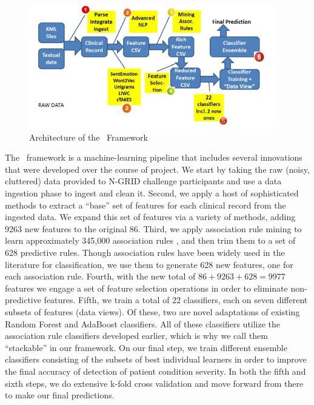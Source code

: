 \begin{figure}[h!t]
	\centering
	\includegraphics[width=0.95\textwidth]{figures/arch.png}
	\caption{Architecture of the \CREATE\ Framework}	
	\label{fig:arch}
\end{figure} 

The \CREATE\ framework is a machine-learning pipeline that includes several innovations that were developed over the course of project. We start by taking the raw (noisy, cluttered) data provided to N-GRID challenge participants and use a data ingestion phase to ingest and clean it.
Second, we apply a host of sophisticated methods to extract a ``base'' set of  features for each clinical record from the ingested data. We expand this set of features
via a variety of methods, adding 9263 new features to the original 86. 
Third, we apply association rule mining to learn approximately 345,000 association rules
\cite{fpgrowth,c5}, and then trim them to a set of 628 predictive rules. Though association rules have been widely used in the literature for classification, we use them to generate 628 new features, one for each association rule.
Fourth, with the new total of $86+9263+628=9977$ features we engage a set of 
feature selection operations in order to eliminate non-predictive features. 
Fifth, we train a total of 22 classifiers, each on seven different subsets
of features (data views). Of these, two are novel adaptations of existing Random Forest \cite{ho95,breiman01} and AdaBoost \cite{adaboost} classifiers. 
All of these classifiers utilize the association rule classifiers developed earlier,
which is why we call them ``stackable'' in our framework. On our final step, 
we train different ensemble classifiers consisting of the subsets of best 
individual learners in order to improve the final accuracy of detection of
patient condition severity. In both the fifth and sixth steps, we do extensive k-fold cross validation and move forward from there to make our final predictions.

